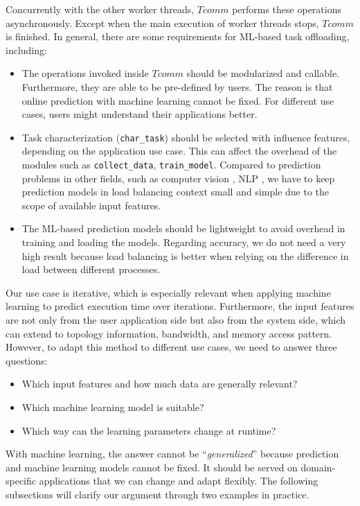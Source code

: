 Concurrently with the other worker threads, $Tcomm$ performs these operations asynchronously. Except when the main execution of worker threads stops, $Tcomm$ is finished. In general, there are some requirements for ML-based task offloading, including:

\begin{itemize}
	\item The operations invoked inside $Tcomm$ should be modularized and callable. Furthermore, they are able to be pre-defined by users. The reason is that online prediction with machine learning cannot be fixed. For different use cases, users might understand their applications better.
	\item Task characterization (\texttt{char\_task}) should be selected with influence features, depending on the application use case. This can affect the overhead of the modules such as \texttt{collect\_data}, \texttt{train\_model}. Compared to prediction problems in other fields, such as computer vision \cite{sebe2006mlincv}, NLP \cite{deng2018dlinnlp}, we have to keep prediction models in load balancing context small and simple due to the scope of available input features.
	\item The ML-based prediction models should be lightweight to avoid overhead in training and loading the models. Regarding accuracy, we do not need a very high result because load balancing is better when relying on the difference in load between different processes.
\end{itemize}

Our use case is iterative, which is especially relevant when applying machine learning to predict execution time over iterations. Furthermore, the input features are not only from the user application side but also from the system side, which can extend to topology information, bandwidth, and memory access pattern. However, to adapt this method to different use cases, we need to answer three questions:
\begin{itemize}
	\item Which input features and how much data are generally relevant?
	\item Which machine learning model is suitable?
	\item Which way can the learning parameters change at runtime?
\end{itemize}

With machine learning, the answer cannot be ``\textit{generalized}'' because prediction and machine learning models cannot be fixed. It should be served on domain-specific applications that we can change and adapt flexibly. The following subsections will clarify our argument through two examples in practice.

